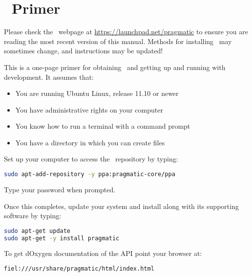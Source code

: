 \chapter*{\pragmatic\ Primer}

Please check the \pragmatic\ webpage at
\href{https://launchpad.net/pragmatic}{https://launchpad.net/pragmatic}
to ensure you are reading the most recent version of this
manual. Methods for installing \pragmatic\ may sometimes change, and
instructions may be updated!

This is a one-page primer for obtaining \pragmatic\ and getting up and
running with development. It assumes that:

\begin{itemize}
\item You are running Ubuntu Linux, release 11.10 or newer
\item You have administrative rights on your computer
\item You know how to run a terminal with a command prompt
\item You have a directory in which you can create files
\end{itemize}

Set up your computer to access the \pragmatic\ repository by typing:

\begin{lstlisting}[language=Bash]
sudo apt-add-repository -y ppa:pragmatic-core/ppa
\end{lstlisting}

Type your password when prompted.

Once this completes, update your system and install \pragmatic along with its
supporting software by typing:

\begin{lstlisting}[language=Bash]
sudo apt-get update
sudo apt-get -y install pragmatic
\end{lstlisting}

To get dOxygen documentation of the API point your browser at:
\begin{lstlisting}[language=Html]
fiel:///usr/share/pragmatic/html/index.html
\end{lstlisting}
